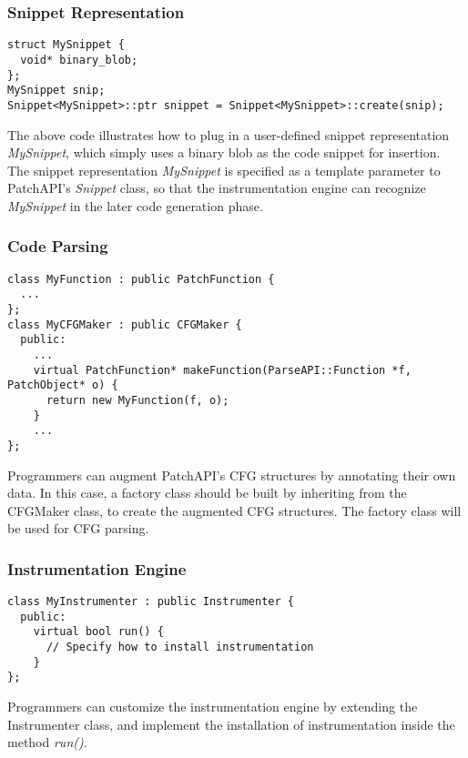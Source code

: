 \subsubsection{Snippet Representation} \label{sec-example-snip}
\lstset{numbers=left}
\begin{lstlisting}
struct MySnippet {
  void* binary_blob;
};
MySnippet snip;
Snippet<MySnippet>::ptr snippet = Snippet<MySnippet>::create(snip);
\end{lstlisting}
The above code illustrates how to plug in a user-defined snippet representation
\emph{MySnippet}, which simply uses a binary blob as the code snippet for
insertion. The snippet representation \emph{MySnippet} is specified as a
template parameter to PatchAPI's \emph{Snippet} class, so that the
instrumentation engine can recognize \emph{MySnippet} in the later code
generation phase.

\subsubsection{Code Parsing}
\lstset{numbers=left}
\begin{lstlisting}
class MyFunction : public PatchFunction {
  ...
};
class MyCFGMaker : public CFGMaker {
  public:
    ...
    virtual PatchFunction* makeFunction(ParseAPI::Function *f, PatchObject* o) {
      return new MyFunction(f, o);
    }
    ...
};
\end{lstlisting}
Programmers can augment PatchAPI's CFG structures by annotating their own data.
In this case, a factory class should be built by inheriting from the
CFGMaker class, to create the augmented CFG structures. The factory class will
be used for CFG parsing.

\subsubsection{Instrumentation Engine}
\lstset{numbers=left}
\begin{lstlisting}
class MyInstrumenter : public Instrumenter {
  public:
    virtual bool run() {
      // Specify how to install instrumentation
    }
};
\end{lstlisting}
Programmers can customize the instrumentation engine by extending the
Instrumenter class, and implement the installation of instrumentation inside the
method \emph{run()}.

